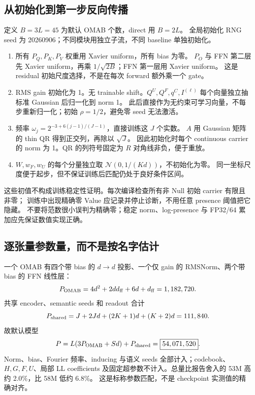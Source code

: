 \documentclass[11pt,UTF8,fontset=fandol]{ctexart}
\begin{document}
\subsection{从初始化到第一步反向传播}
定义 $B=3L=45$ 为默认 OMAB 个数，direct 用 $B=2L$。
全局初始化 RNG seed 为 20260906；不同模块用独立子流，不同 baseline 单独初始化。
\begin{enumerate}
\item 所有 $P_Q,P_K,P_V$ 权重用 Xavier uniform，所有 bias 为零。
$P_O$ 与 FFN 第二层先 Xavier uniform，再乘 $1/\sqrt{2B}$；FFN 第一层用 Xavier uniform。
这是 residual 初始尺度选择，不是在每次 forward 额外乘一个 gate。
\item RMS gain 初始化为 1。无 trainable shift。$Q^U,Q^F,q^C,I^{(\ell)}$ 每个向量独立抽标准 Gaussian 后归一化到 norm 1。
此后直接作为无约束可学习向量，不每步重新归一化；初始 $\rho=1/2$，避免零 seed 无法激活。
\item 频率 $\omega_j=2^{-3+6(j-1)/(J-1)}$，直接训练这 $J$ 个实数。
$A$ 用 Gaussian 矩阵的 thin QR 得到正交列，再除以 $\sqrt J$。
因此初始化时每个 continuous carrier 的 norm 为 1。QR 的列符号固定为 $R$ 对角线非负，便于重放。
\item $W,w_F,w_U$ 的每个分量独立取 $\mathcal N(0,1/(Kd))$，不初始化为零。
同一坐标尺度便于起步，但不保证训练后匹配仍处于良好条件区间。
\end{enumerate}

这些初值不构成训练稳定性证明。每次编译检查所有非 Null 初始 carrier 有限且非零；
训练中出现精确零 Value 应记录并停止诊断，不用任意 presence 阈值把它隐藏。
不要将范数很小误判为精确零；稳定 norm、log-presence 与 FP32/64 累加应先保证数值实现正确。

\subsection{逐张量参数量，而不是按名字估计}
一个 OMAB 有四个带 bias 的 $d\to d$ 投影、一个仅 gain 的 RMSNorm、两个带 bias 的 FFN 线性层：
\begin{equation}
 P_{\rm OMAB}=4d^2+2dd_{\rm ff}+6d+d_{\rm ff}=1,182,720.
 \label{eq:count-omab}
\end{equation}
共享 encoder、semantic seeds 和 readout 合计
\begin{equation}
 P_{\rm shared}=J+2Jd+(2K+1)d+(K+2)d=111,840.
 \label{eq:count-shared}
\end{equation}
故默认模型
\begin{equation}
 P=L(3P_{\rm OMAB}+Sd)+P_{\rm shared}
 =\boxed{54,071,520}.
 \label{eq:parameter-count}
\end{equation}
Norm、bias、Fourier 频率、inducing 与语义 seeds 全部计入；codebook、$H,G,F,U$、局部 LL coefficients
及固定超参数不计入。总量比报告舍入的 53M 高约 2.0\%，比 58M 低约 6.8\%。
这是标称参数匹配，不是 checkpoint 实测值的精确对齐。
\end{document}

